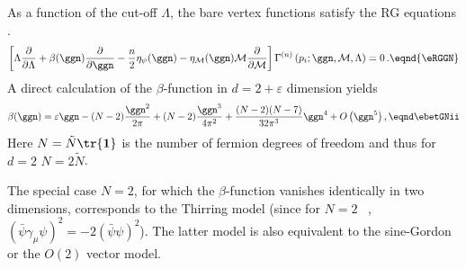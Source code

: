 As  a function of the cut-off $\Lambda$, the bare vertex functions
satisfy the RG equations  \rGNZJ.
$$\left[ \Lambda{ \partial \over \partial
\Lambda} +\beta (\ggn){\partial \over \partial \ggn}-{n \over
2}\eta_{\psi}(\ggn)-\eta_{\cal M}(\ggn){\cal M}{\partial \over \partial {\cal M}} \right]
 \Gamma^{(n)}\left(p_{i};\ggn,{\cal M},\Lambda \right)=0\, .\eqnd{\eRGGN}$$
A direct calculation of the $\beta$-function in $d=2+\varepsilon$
dimension yields \rGNeps
$$\beta(\ggn)=\varepsilon \ggn-(N-2){\ggn^2 \over
2\pi}+(N-2){\ggn^3 \over4\pi^2}+{(N-2)(N-7)\over 32\pi^3}\ggn^4
+O\left(\ggn^5\right),\eqnd \ebetGNii $$ Here $N=\tilde N\tr{\bf
1}$ is the number of fermion degrees of freedom and thus for $d=2$
$N=2 \tilde N$.\par The special case $N=2$, for which the
$\beta$-function vanishes identically in two dimensions,
corresponds to the Thirring model (since for $N=2$ ~,~ $(\bar\psi
\gamma_{\mu}\psi)^2=-2 (\bar \psi\psi )^2$). The latter model is
also equivalent to the sine-Gordon or the $O(2)$ vector model.

